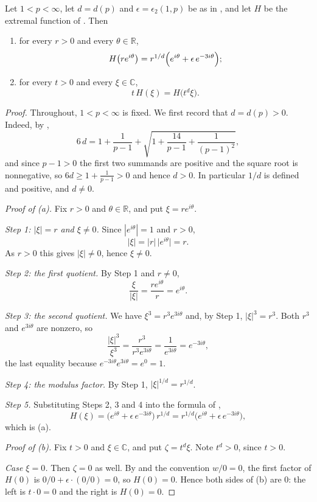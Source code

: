\begin{lemma}
Let $1<p<\infty$, let $d=d(p)$ and $\epsilon=\epsilon_2(1,p)$ be as in
, and let $H$ be the extremal function of
.  Then
\begin{enumerate}
\item[(a)] for every $r>0$ and every $\theta\in\mathbb{R}$,
\[
  H\bigl(re^{i\theta}\bigr)=r^{1/d}\Bigl(e^{i\theta}+\epsilon\,e^{-3i\theta}\Bigr);
\]
\item[(b)] for every $t>0$ and every $\xi\in\mathbb{C}$,
\[
  t\,H(\xi)=H\bigl(t^{d}\xi\bigr).
\]
\end{enumerate}
\end{lemma}
\begin{proof}
Throughout, $1<p<\infty$ is fixed.  We first record that $d=d(p)>0$.  Indeed,
by ,
\[
  6\,d=1+\frac{1}{p-1}+\sqrt{1+\frac{14}{p-1}+\frac{1}{(p-1)^2}} ,
\]
and since $p-1>0$ the first two summands are positive and the square root is
nonnegative, so $6d\ge1+\frac1{p-1}>0$ and hence $d>0$.  In particular $1/d$
is defined and positive, and $d\neq0$.

\emph{Proof of (a).}  Fix $r>0$ and $\theta\in\mathbb{R}$, and put
$\xi=re^{i\theta}$.

\emph{Step 1: $|\xi|=r$ and $\xi\neq0$.}  Since $|e^{i\theta}|=1$ and $r>0$,
\[
  |\xi|=|r|\,\bigl|e^{i\theta}\bigr|=r .
\]
As $r>0$ this gives $|\xi|\neq0$, hence $\xi\neq0$.

\emph{Step 2: the first quotient.}  By Step 1 and $r\neq0$,
\[
  \frac{\xi}{|\xi|}=\frac{re^{i\theta}}{r}=e^{i\theta}.
\]

\emph{Step 3: the second quotient.}  We have
$\xi^{3}=r^{3}e^{3i\theta}$ and, by Step 1, $|\xi|^{3}=r^{3}$.  Both $r^{3}$
and $e^{3i\theta}$ are nonzero, so
\[
  \frac{|\xi|^{3}}{\xi^{3}}=\frac{r^{3}}{r^{3}e^{3i\theta}}
  =\frac{1}{e^{3i\theta}}=e^{-3i\theta},
\]
the last equality because $e^{-3i\theta}e^{3i\theta}=e^{0}=1$.

\emph{Step 4: the modulus factor.}  By Step 1, $|\xi|^{1/d}=r^{1/d}$.

\emph{Step 5.}  Substituting Steps 2, 3 and 4 into the formula of
,
\[
  H(\xi)=\bigl(e^{i\theta}+\epsilon\,e^{-3i\theta}\bigr)\,r^{1/d}
  =r^{1/d}\bigl(e^{i\theta}+\epsilon\,e^{-3i\theta}\bigr),
\]
which is (a).

\emph{Proof of (b).}  Fix $t>0$ and $\xi\in\mathbb{C}$, and put
$\zeta=t^{d}\xi$.  Note $t^{d}>0$, since $t>0$.

\emph{Case $\xi=0$.}  Then $\zeta=0$ as well.  By  and the
convention $w/0=0$, the first factor of $H(0)$ is
$0/0+\epsilon\cdot(0/0)=0$, so $H(0)=0$.  Hence both sides of (b) are $0$:
the left is $t\cdot0=0$ and the right is $H(0)=0$.


\end{proof}
